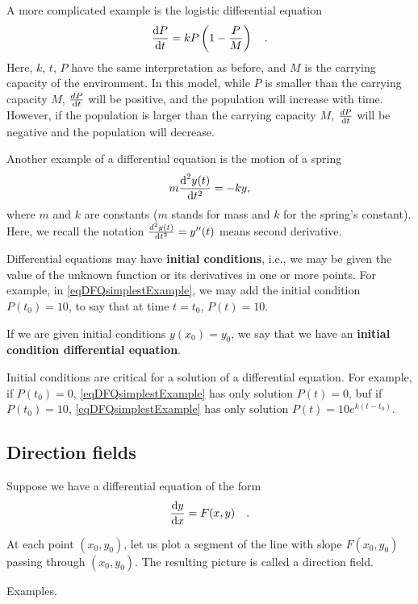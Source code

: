 \documentclass[12pt]{book}
\renewcommand{\optionalDisplay}[1]{}
\renewcommand{\emph}{\textbf}
\begin{document}
A more complicated example is the logistic differential equation
\[
\frac{{\normalfont \text{d}} P }{{\normalfont \text{d}} t} = k P\left(1- \frac{P}{M}\right)\quad.
\]
Here, $k$, $t$, $P$ have the same interpretation as before, and $M$ is the carrying capacity of the environment. In this model, while $P$ is smaller than the carrying capacity $M$,  $\frac{dP}{{\normalfont \text{d}} t}$ will be positive, and the population will increase with time. However, if the population is larger than the carrying capacity $M$, $\frac{d P }{{\normalfont \text{d}} t}$ will be negative and the population will decrease.

Another example of a differential equation is the motion of a spring
\[
m\frac{{\normalfont \text{d}}^2 y (t)}{{\normalfont \text{d}} t^2}= -k y,
\]
where $m$ and $k$ are constants ($m$ stands for mass and $k$ for the spring's constant). Here, we recall the notation $\frac{d^2 y (t)}{{\normalfont \text{d}} t^2}= y''(t)$ means second derivative.


Differential equations may have \emph{initial conditions}, i.e., we may be given the value of the unknown function or its derivatives in one or more points. For example, in \eqref{eqDFQsimplestExample}, we may add the initial condition $P(t_0)= 10$, to say that at time $t=t_0$, $P(t)=10$.

If we are given initial conditions $y(x_0)=y_0$, we say that we have  an \emph{initial condition differential equation}.

Initial conditions are critical for a solution of a differential equation. For example, if $P(t_0)=0$, \eqref{eqDFQsimplestExample} has only solution $P(t)=0$, buf if $P(t_0)=10$, \eqref{eqDFQsimplestExample} has only solution $P(t)=10  e^{k(t-t_0)}$.
\subsection{Direction fields}
Suppose we have a differential equation of the form
\begin{equation}\label{eqDFQwithDirectionFlow}
\frac{{\normalfont \text{d}} y}{{\normalfont \text{d}} x}= F(x,y)\quad.
\end{equation}

At each point $(x_0,y_0)$, let us plot a segment of the line with slope $F(x_0,y_0)$ passing through $(x_0,y_0)$. The resulting picture is called a direction field.

Examples.

\optionalDisplay{
\psset{xunit=1cm,yunit=1cm}
\SpecialCoor
\begin{pspicture}(-5,-5)(5,5)
\psaxes{<->}(0,0)(-5,-5)(5,5)
\rput (5,5){The direction field $\frac{\diff y}{\diff x}=xy$}%
\fcDirectionFieldDefault{x y mul}{-4}{-4}{0.5}{17}
\end{pspicture}

\begin{pspicture}(-5,-5)(5,5)
\psaxes{<->}(0,0)(-5,-6)(5,5)
\rput (5,5){The direction field $\frac{\diff y}{\diff x}=x+y$}
\fcDirectionFieldDefault{x y add}{-4}{-4}{0.5}{17}
\end{pspicture}
}%
\end{document}
